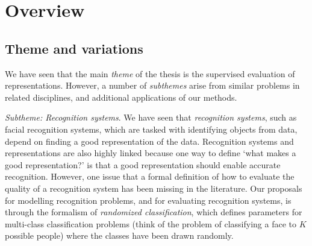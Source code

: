 \section{Overview}

\subsection{Theme and variations}

We have seen that the main \emph{theme} of the thesis is the
supervised evaluation of representations.  However, a number
of \emph{subthemes} arise from similar problems in related
disciplines, and additional applications of our methods.

\emph{Subtheme: Recognition systems}.  We have seen that
\emph{recognition systems}, such as facial recognition systems, which
are tasked with identifying objects from data, depend on finding a
good representation of the data.  Recognition systems and
representations are also highly linked because one way to define `what
makes a good representation?' is that a good representation should
enable accurate recognition.  However, one issue that a formal
definition of how to evaluate the quality of a recognition system has
been missing in the literature.  Our proposals for modelling
recognition problems, and for evaluating recognition systems, is
through the formalism of \emph{randomized classification}, which
defines parameters for multi-class classification problems (think of
the problem of classifying a face to $K$ possible people) where the
classes have been drawn randomly.

